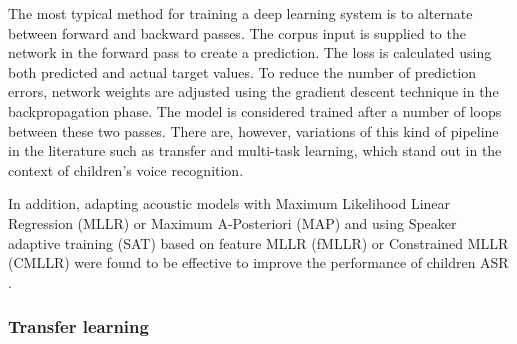 The most typical method for training a deep learning system is to alternate between forward and backward passes. The corpus input is supplied to the network in the forward pass to create a prediction. The loss is calculated using both predicted and actual target values. To reduce the number of prediction errors, network weights are adjusted using the gradient descent technique in the backpropagation phase. The model is considered trained after a number of loops between these two passes. There are, however, variations of this kind of pipeline in the literature such as transfer and multi-task learning, which stand out in the context of children's voice recognition.


In addition, adapting acoustic models with Maximum Likelihood Linear Regression (MLLR) or Maximum A-Posteriori (MAP) and using Speaker adaptive training (SAT) based on feature MLLR (fMLLR) or Constrained MLLR (CMLLR) were found to be effective to improve the  performance of children ASR \cite{pronunciation, asr-improved2, children_language_model2, reviewASRchildren}.


\subsubsection{Transfer learning}%
\label{section:TL}

